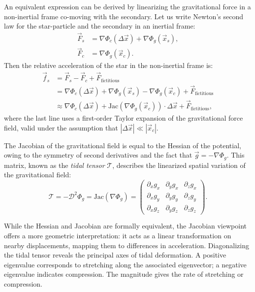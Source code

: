         An equivalent expression can be derived by linearizing the gravitational force in a non-inertial frame co-moving with the secondary. Let us write Newton's second law for the star-particle and the secondary in an inertial frame:
        \begin{eqnarray}
            \vec{F}_s &= \nabla \Phi_c\left(\Delta \vec{x}\right) + \nabla \Phi_g\left(\vec{x}_s\right),\\
            \vec{F}_c &= \nabla \Phi_g\left(\vec{x}_c\right).
        \end{eqnarray}
        Then the relative acceleration of the star in the non-inertial frame is:
        \begin{eqnarray}
            \vec{f}_s &= \vec{F}_s - \vec{F}_c + \vec{F}_\mathrm{fictitious} \\
                    &= \nabla \Phi_c\left(\Delta \vec{x}\right) + \nabla \Phi_g\left(\vec{x}_s\right) - \nabla \Phi_g\left(\vec{x}_c\right) + \vec{F}_\mathrm{fictitious} \\
                    &\approx \nabla \Phi_c\left(\Delta \vec{x}\right) + \mathrm{Jac}\left(\nabla \Phi_g(\vec{x}_c)\right) \cdot \Delta \vec{x} + \vec{F}_\mathrm{fictitious},
        \end{eqnarray}
        where the last line uses a first-order Taylor expansion of the gravitational force field, valid under the assumption that \(|\Delta \vec{x}| \ll |\vec{x}_c|\). 

        The Jacobian of the gravitational field is equal to the Hessian of the potential, owing to the symmetry of second derivatives and the fact that \(\vec{g} = -\nabla \Phi_g\). This matrix, known as the \textit{tidal tensor} \(\mathcal{T}\), describes the linearized spatial variation of the gravitational field:
        \begin{equation}
            \mathcal{T} = -\mathcal{D}^2\Phi_g = \mathrm{Jac}(\nabla \Phi_g) = \left(\begin{matrix}
                \partial_x g_x & \partial_y g_x & \partial_z g_x \\
                \partial_x g_y & \partial_y g_y & \partial_z g_y \\
                \partial_x g_z & \partial_y g_z & \partial_z g_z 
            \end{matrix}\right).
        \end{equation}

        While the Hessian and Jacobian are formally equivalent, the Jacobian viewpoint offers a more geometric interpretation: it acts as a linear transformation on nearby displacements, mapping them to differences in acceleration. Diagonalizing the tidal tensor reveals the principal axes of tidal deformation. A positive eigenvalue corresponds to stretching along the associated eigenvector; a negative eigenvalue indicates compression. The magnitude gives the rate of stretching or compression.

